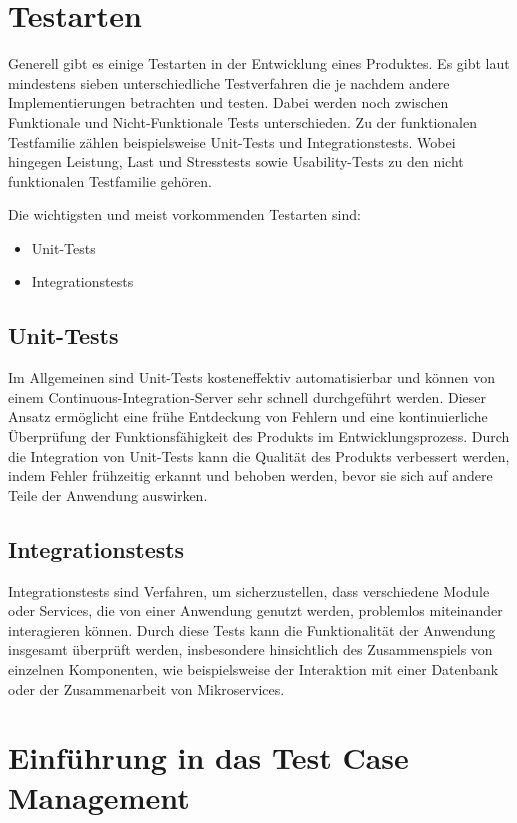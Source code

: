 \documentclass[a4paper, fontsize=11pt, parskip=half, twoside]{scrreprt}
\begin{document}
	
	\section{Testarten}
	Generell gibt es einige Testarten in der Entwicklung eines Produktes. 
	Es gibt laut \textcite{atlassian_unterschiedlichen_nodate} mindestens sieben unterschiedliche Testverfahren die je nachdem andere Implementierungen betrachten und testen.
	Dabei werden noch zwischen Funktionale und Nicht-Funktionale Tests unterschieden.
	Zu der funktionalen Testfamilie zählen beispielsweise Unit-Tests und Integrationstests.
	Wobei hingegen Leistung, Last und Stresstests sowie Usability-Tests zu den nicht funktionalen Testfamilie gehören.
	\textcite{noauthor_software_nodate}
	
	Die wichtigsten und meist vorkommenden Testarten sind:
	
	\begin{itemize}
		\item Unit-Tests
		\item Integrationstests
	\end{itemize}
	
	\subsection{Unit-Tests}
	Im Allgemeinen sind Unit-Tests kosteneffektiv automatisierbar und können von einem Continuous-Integration-Server sehr schnell durchgeführt werden. 
	Dieser Ansatz ermöglicht eine frühe Entdeckung von Fehlern und eine kontinuierliche Überprüfung der Funktionsfähigkeit des Produkts im Entwicklungsprozess. 
	Durch die Integration von Unit-Tests kann die Qualität des Produkts verbessert werden, indem Fehler frühzeitig erkannt und behoben werden, bevor sie sich auf andere Teile der Anwendung auswirken.
	
	\subsection{Integrationstests}
	Integrationstests sind Verfahren, um sicherzustellen, dass verschiedene Module oder Services, die von einer Anwendung genutzt werden, problemlos miteinander interagieren können. 
	Durch diese Tests kann die Funktionalität der Anwendung insgesamt überprüft werden, insbesondere hinsichtlich des Zusammenspiels von einzelnen Komponenten, wie beispielsweise der Interaktion mit einer Datenbank oder der Zusammenarbeit von Mikroservices.
	
	
	\section{Einführung in das Test Case Management}
	
\end{document}
